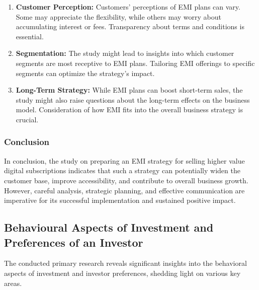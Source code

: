 \begin{enumerate}
    \item \textbf{Customer Perception:} Customers' perceptions of EMI plans can vary. Some may appreciate the flexibility, while others may worry about accumulating interest or fees. Transparency about terms and conditions is essential.

    \item \textbf{Segmentation:} The study might lead to insights into which customer segments are most receptive to EMI plans. Tailoring EMI offerings to specific segments can optimize the strategy's impact.

    \item \textbf{Long-Term Strategy:} While EMI plans can boost short-term sales, the study might also raise questions about the long-term effects on the business model. Consideration of how EMI fits into the overall business strategy is crucial.
\end{enumerate}
\subsubsection{Conclusion}
In conclusion, the study on preparing an EMI strategy for selling higher value digital subscriptions indicates that such a strategy can potentially widen the customer base, improve accessibility, and contribute to overall business growth. However, careful analysis, strategic planning, and effective communication are imperative for its successful implementation and sustained positive impact.


\subsection{Behavioural Aspects of Investment and Preferences of an Investor}

The conducted primary research reveals significant insights into the behavioral aspects of investment and investor preferences, shedding light on various key areas.

